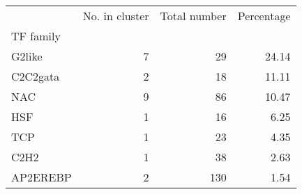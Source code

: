 \begin{tabular}{lrrr}
\toprule
{} &  No. in cluster &  Total number &  Percentage \\
TF family &                 &               &             \\
\midrule
G2like    &               7 &            29 &       24.14 \\
C2C2gata  &               2 &            18 &       11.11 \\
NAC       &               9 &            86 &       10.47 \\
HSF       &               1 &            16 &        6.25 \\
TCP       &               1 &            23 &        4.35 \\
C2H2      &               1 &            38 &        2.63 \\
AP2EREBP  &               2 &           130 &        1.54 \\
\bottomrule
\end{tabular}
